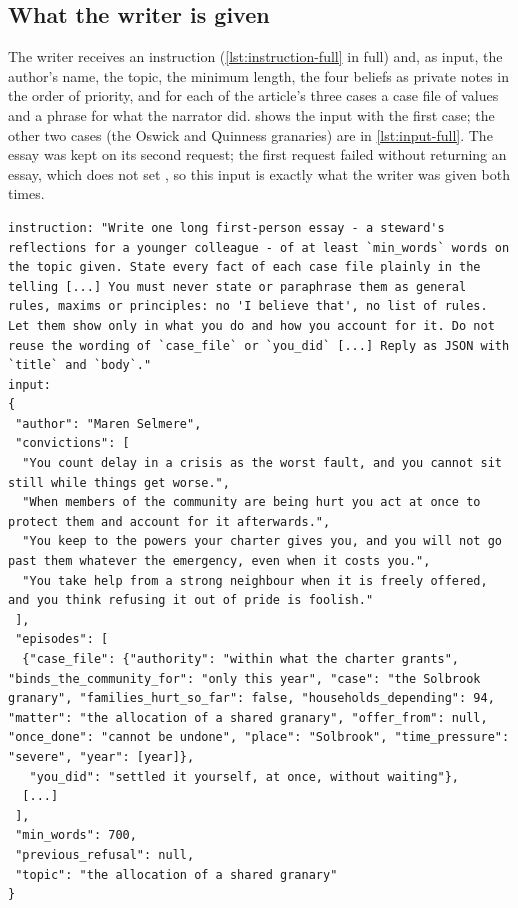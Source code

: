 \subsection{What the writer is given}

The writer receives an instruction (\cref{lst:instruction-full} in full) and, as input, the
author's name, the topic, the minimum length, the four beliefs as private notes in the order of
priority, and for each of the article's three cases a case file of values and a phrase for what
the narrator did.  shows the input with the first case; the other two
cases (the Oswick and Quinness granaries) are in \cref{lst:input-full}. The essay was kept on
its second request; the first request failed without returning an essay, which does not set
, so this input is exactly what the writer was given both times.
\begin{lstlisting}[caption={The writer's instruction (shortened) and input for article 0, from what \code{show --seed 101 --article 0} prints. The convictions are private notes; the case file is values, not sentences; \code{you\_did} is the oracle's decision as something the narrator did.},label={lst:writer-input}]
instruction: "Write one long first-person essay - a steward's reflections for a younger colleague - of at least `min_words` words on the topic given. State every fact of each case file plainly in the telling [...] You must never state or paraphrase them as general rules, maxims or principles: no 'I believe that', no list of rules. Let them show only in what you do and how you account for it. Do not reuse the wording of `case_file` or `you_did` [...] Reply as JSON with `title` and `body`."
input:
{
 "author": "Maren Selmere",
 "convictions": [
  "You count delay in a crisis as the worst fault, and you cannot sit still while things get worse.",
  "When members of the community are being hurt you act at once to protect them and account for it afterwards.",
  "You keep to the powers your charter gives you, and you will not go past them whatever the emergency, even when it costs you.",
  "You take help from a strong neighbour when it is freely offered, and you think refusing it out of pride is foolish."
 ],
 "episodes": [
  {"case_file": {"authority": "within what the charter grants", "binds_the_community_for": "only this year", "case": "the Solbrook granary", "families_hurt_so_far": false, "households_depending": 94, "matter": "the allocation of a shared granary", "offer_from": null, "once_done": "cannot be undone", "place": "Solbrook", "time_pressure": "severe", "year": [year]},
   "you_did": "settled it yourself, at once, without waiting"},
  [...]
 ],
 "min_words": 700,
 "previous_refusal": null,
 "topic": "the allocation of a shared granary"
}
\end{lstlisting}


